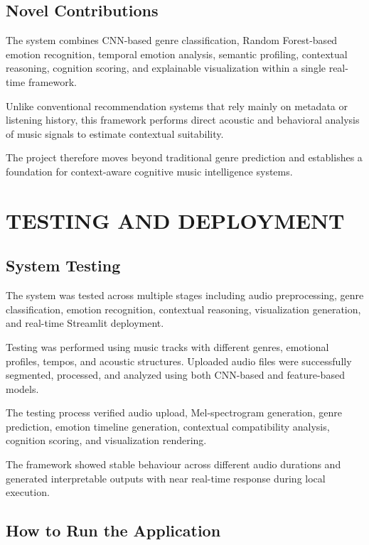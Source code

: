 \documentclass[12pt,a4paper]{report}
\begin{document}
\section{Novel Contributions}

The system combines CNN-based genre classification, Random Forest-based emotion recognition, temporal emotion analysis, semantic profiling, contextual reasoning, cognition scoring, and explainable visualization within a single real-time framework.

Unlike conventional recommendation systems that rely mainly on metadata or listening history, this framework performs direct acoustic and behavioral analysis of music signals to estimate contextual suitability.

The project therefore moves beyond traditional genre prediction and establishes a foundation for context-aware cognitive music intelligence systems.

\chapter{TESTING AND DEPLOYMENT}

\section{System Testing}

The system was tested across multiple stages including audio preprocessing, genre classification, emotion recognition, contextual reasoning, visualization generation, and real-time Streamlit deployment.

Testing was performed using music tracks with different genres, emotional profiles, tempos, and acoustic structures. Uploaded audio files were successfully segmented, processed, and analyzed using both CNN-based and feature-based models.

The testing process verified audio upload, Mel-spectrogram generation, genre prediction, emotion timeline generation, contextual compatibility analysis, cognition scoring, and visualization rendering.

The framework showed stable behaviour across different audio durations and generated interpretable outputs with near real-time response during local execution.

\section{How to Run the Application}
\end{document}
